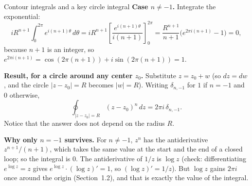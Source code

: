 \documentclass[11pt]{beamer}
\begin{document}
\begin{frame}[allowframebreaks=1.00]{Contour integrals and a key circle integral}
\textbf{Case \(n\ne-1\).} Integrate the exponential:
\[
 iR^{n+1}\int_0^{2\pi}e^{i(n+1)\theta}\,d\theta
 =iR^{n+1}\left[\frac{e^{i(n+1)\theta}}{i(n+1)}\right]_{0}^{2\pi}
 =\frac{R^{n+1}}{n+1}\bigl(e^{2\pi i(n+1)}-1\bigr)=0,
\]
because \(n+1\) is an integer, so \(e^{2\pi i(n+1)}=\cos(2\pi(n+1))+i\sin(2\pi(n+1))=1\).
\par\framebreak\par
\textbf{Result, for a circle around any center \(z_0\).} Substitute \(z=z_0+w\) (so \(dz=dw\), and the
circle \(|z-z_0|=R\) becomes \(|w|=R\)). Writing \(\delta_{n,-1}\) for \(1\) if \(n=-1\) and \(0\) otherwise,
\begin{equation}
 \oint_{|z-z_0|=R}(z-z_0)^n\,dz=2\pi i\,\delta_{n,-1}.
 \label{eq:circ-power}
\end{equation}
Notice that the answer does not depend on the radius \(R\).

\textbf{Why only \(n=-1\) survives.} For \(n\ne-1\), \(z^n\) has the antiderivative
\(z^{n+1}/(n+1)\), which takes the same value at the start and the end of a closed loop; so the
integral is \(0\). The antiderivative of \(1/z\) is \(\log z\) (check: differentiating \(e^{\log z}=z\)
gives \(e^{\log z}\cdot(\log z)'=1\), so \((\log z)'=1/z\)). But \(\log z\) gains \(2\pi i\) once around the
origin (Section~1.2), and that is exactly the value of the integral.
\end{frame}
\end{document}
